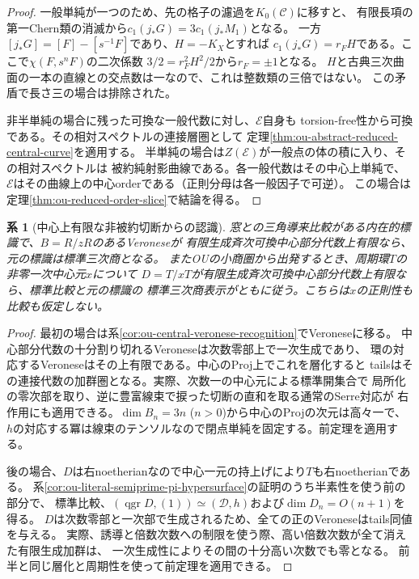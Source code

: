 \documentclass[11pt,a4paper]{ltjsarticle}
\newtheorem{corollary}[theorem]{系}
\theoremstyle{definition}
\newcommand{\qgr}{\operatorname{qgr}}
\begin{document}
\begin{proof}
一般単純が一つのため、先の格子の濾過を$K_0(\mathcal C)$に移すと、
有限長項の第一Chern類の消滅から$c_1(j_*G)=3c_1(j_*M_1)$となる。
一方$[j_*G]=[F]-[s^{-1}F]$であり、$H=-K_X$とすれば
$c_1(j_*G)=r_F H$である。ここで$\chi(F,s^n F)$の二次係数
$3/2=r_F^2 H^2/2$から$r_F=\pm1$となる。
$H$と古典三次曲面の一本の直線との交点数は一なので、これは整数類の三倍ではない。
この矛盾で長さ三の場合は排除された。

非半単純の場合に残った可換な一般代数に対し、$\mathcal E$自身も
torsion-free性から可換である。その相対スペクトルの連接層圏として
定理\ref{thm:ou-abstract-reduced-central-curve}を適用する。
半単純の場合は$Z(\mathcal E)$が一般点の体の積に入り、その相対スペクトルは
被約純射影曲線である。各一般代数はその中心上単純で、
$\mathcal E$はその曲線上の中心orderである（正則分母は各一般因子で可逆）。
この場合は定理\ref{thm:ou-reduced-order-slice}で結論を得る。
\end{proof}

\begin{corollary}[中心上有限な非被約切断からの認識]
\label{cor:ou-finite-central-nonreduced-cut}
窓との三角導来比較がある内在的標識で、$B=R/zR$のあるVeroneseが
有限生成斉次可換中心部分代数上有限なら、元の標識は標準三次商となる。
またOUの小商圏から出発するとき、周期環$T$の非零一次中心元$x$について
$D=T/xT$が有限生成斉次可換中心部分代数上有限なら、標準比較と元の標識の
標準三次商表示がともに従う。こちらは$x$の正則性も比較も仮定しない。
\end{corollary}
\begin{proof}
最初の場合は系\ref{cor:ou-central-veronese-recognition}でVeroneseに移る。
中心部分代数の十分割り切れるVeroneseは次数零部上で一次生成であり、
環の対応するVeroneseはその上有限である。中心のProj上でこれを層化すると
tailsはその連接代数の加群圏となる。実際、次数一の中心元による標準開集合で
局所化の零次部を取り、逆に豊富線束で捩った切断の直和を取る通常のSerre対応が
右作用にも適用できる。$\dim B_n=3n$ ($n>0$)から中心のProjの次元は高々一で、
$h$の対応する冪は線束のテンソルなので閉点単純を固定する。前定理を適用する。

後の場合、$D$は右noetherianなので中心一元の持上げにより$T$も右noetherianである。
系\ref{cor:ou-literal-semiprime-pi-hypersurface}の証明のうち半素性を使う前の部分で、
標準比較、$(\qgr D,(1))\simeq(\mathcal D,h)$および$\dim D_n=O(n+1)$を得る。
$D$は次数零部と一次部で生成されるため、全ての正のVeroneseはtails同値を与える。
実際、誘導と倍数次数への制限を使う際、高い倍数次数が全て消えた有限生成加群は、
一次生成性によりその間の十分高い次数でも零となる。
前半と同じ層化と周期性を使って前定理を適用できる。
\end{proof}
\end{document}
